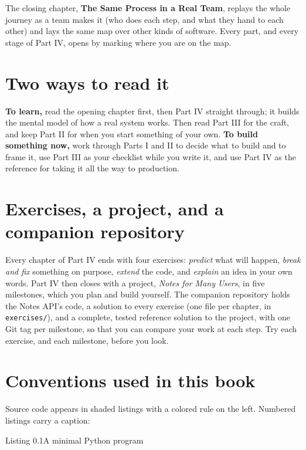 \noindent The closing chapter, \textbf{The Same Process in a Real Team}, replays the whole journey as a
team makes it (who does each step, and what they hand to each other) and lays the same map over
other kinds of software. Every part, and every stage of Part IV, opens by marking where you are on
the map.

\section*{Two ways to read it}

\textbf{To learn,} read the opening chapter first, then Part IV straight through; it builds the
mental model of how a real system works. Then read Part III for the craft, and keep Part II for when you start something of
your own. \textbf{To build something now,} work through Parts I and II to decide what to build and to
frame it, use Part III as your checklist while you write it, and use Part IV as the reference for
taking it all the way to production.

\section*{Exercises, a project, and a companion repository}

Every chapter of Part IV ends with four exercises: \emph{predict} what will happen, \emph{break and
fix} something on purpose, \emph{extend} the code, and \emph{explain} an idea in your own words.
Part IV then closes with a project, \emph{Notes for Many Users}, in five milestones, which you plan
and build yourself. The companion repository holds the Notes API's code, a solution to every
exercise (one file per chapter, in \texttt{exercises/}), and a complete, tested reference solution to
the project, with one Git tag per milestone, so that you can compare your work at each step.
Try each exercise, and each milestone, before you look.

\section*{Conventions used in this book}

Source code appears in shaded listings with a colored rule on the left. Numbered listings carry
a caption:

\begin{codeboxcap}{\textcolor{accent}{Listing 0.1}\enspace A minimal Python program}
\begin{Shaded}
\begin{Highlighting}[]
\NormalTok{) }\OperatorTok{{-}\textgreater{}} \NormalTok{:}
     \SpecialCharTok{\{}\SpecialCharTok{\}}
\end{Highlighting}
\end{Shaded}
\end{codeboxcap}

